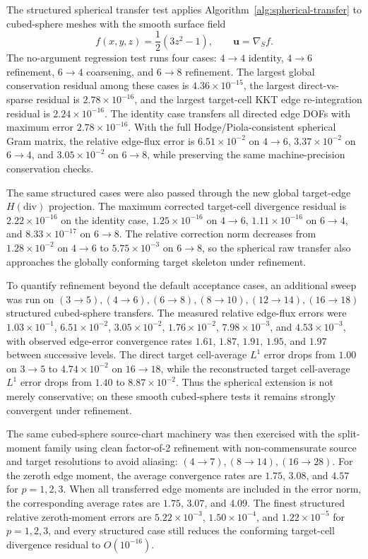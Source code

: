 \documentclass[11pt]{article}
\begin{document}
The structured spherical transfer test applies Algorithm~\ref{alg:spherical-transfer}
to cubed-sphere meshes with the smooth surface field
\[
  f(x,y,z)=\frac{1}{2}(3z^2-1),\qquad
  \mathbf{u}=\nabla_S f.
\]
The no-argument regression test runs four cases: \(4\to4\) identity,
\(4\to6\) refinement, \(6\to4\) coarsening, and \(6\to8\) refinement.  The
largest global conservation residual among these cases is
\(4.36\times10^{-15}\), the largest direct-vs-sparse residual is
\(2.78\times10^{-16}\), and the largest target-cell KKT edge re-integration
residual is \(2.24\times10^{-16}\).  The identity case transfers all directed
edge DOFs with maximum error \(2.78\times10^{-16}\).  With the full
Hodge/Piola-consistent spherical Gram matrix, the relative edge-flux error is
\(6.51\times10^{-2}\) on \(4\to6\), \(3.37\times10^{-2}\) on \(6\to4\), and
\(3.05\times10^{-2}\) on \(6\to8\), while preserving the same machine-precision
conservation checks.

The same structured cases were also passed through the new global target-edge
\(H(\mathrm{div})\) projection.  The maximum corrected target-cell divergence
residual is \(2.22\times10^{-16}\) on the identity case,
\(1.25\times10^{-16}\) on \(4\to6\), \(1.11\times10^{-16}\) on \(6\to4\), and
\(8.33\times10^{-17}\) on \(6\to8\).  The relative correction norm decreases
from \(1.28\times10^{-2}\) on \(4\to6\) to \(5.75\times10^{-3}\) on \(6\to8\),
so the spherical raw transfer also approaches the globally conforming target
skeleton under refinement.

To quantify refinement beyond the default acceptance cases, an additional sweep
was run on \((3\to5), (4\to6), (6\to8), (8\to10), (12\to14), (16\to18)\)
structured cubed-sphere transfers.  The measured relative edge-flux errors were
\(1.03\times10^{-1}\), \(6.51\times10^{-2}\), \(3.05\times10^{-2}\),
\(1.76\times10^{-2}\), \(7.98\times10^{-3}\), and \(4.53\times10^{-3}\), with
observed edge-error convergence rates \(1.61\), \(1.87\), \(1.91\), \(1.95\),
and \(1.97\) between successive levels.  The direct target cell-average
\(L^1\) error drops from \(1.00\) on \(3\to5\) to \(4.74\times10^{-2}\) on
\(16\to18\), while the reconstructed target cell-average \(L^1\) error drops
from \(1.40\) to \(8.87\times10^{-2}\).  Thus the spherical extension is not
merely conservative; on these smooth cubed-sphere tests it remains strongly
convergent under refinement.

The same cubed-sphere source-chart machinery was then exercised with the
split-moment family using clean factor-of-2 refinement with non-commensurate
source and target resolutions to avoid aliasing:
\((4\to7), (8\to14), (16\to28)\).  For the zeroth edge moment, the
average convergence rates are \(1.75\), \(3.08\), and \(4.57\) for
\(p=1,2,3\).  When all transferred edge moments are included in the error norm,
the corresponding average rates are \(1.75\), \(3.07\), and \(4.09\).  The
finest structured relative zeroth-moment errors are
\(5.22\times10^{-3}\), \(1.50\times10^{-4}\), and \(1.22\times10^{-5}\) for
\(p=1,2,3\), and every structured case still reduces the conforming target-cell
divergence residual to \(O(10^{-16})\).
\end{document}
